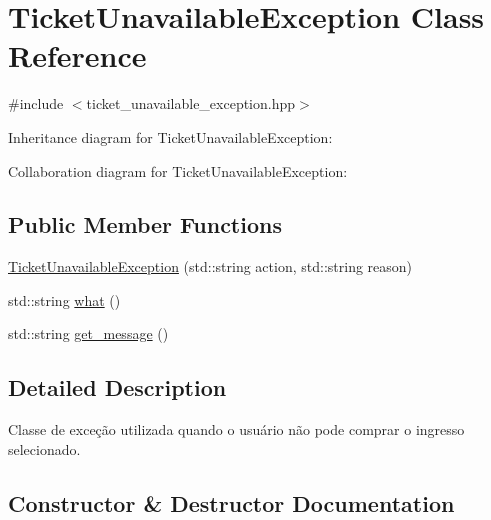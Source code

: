 \hypertarget{class_ticket_unavailable_exception}{}\section{Ticket\+Unavailable\+Exception Class Reference}
\label{class_ticket_unavailable_exception}


{\ttfamily \#include $<$ticket\+\_\+unavailable\+\_\+exception.\+hpp$>$}



Inheritance diagram for Ticket\+Unavailable\+Exception\+:


Collaboration diagram for Ticket\+Unavailable\+Exception\+:
\subsection*{Public Member Functions}
\begin{DoxyCompactItemize}
\item 
\hyperlink{class_ticket_unavailable_exception_aeedce6fc143b11709b330fc961cb357d}{Ticket\+Unavailable\+Exception} (std\+::string action, std\+::string reason)
\item 
std\+::string \hyperlink{class_ticket_unavailable_exception_a6b364ac50564675499a5f24f8d97faed}{what} ()
\item 
std\+::string \hyperlink{class_ticket_unavailable_exception_a4aadce4bf1d2958e91576d4d4cad1102}{get\+\_\+message} ()
\end{DoxyCompactItemize}


\subsection{Detailed Description}
Classe de exceção utilizada quando o usuário não pode comprar o ingresso selecionado. 

\subsection{Constructor \& Destructor Documentation}
\mbox{\label{class_ticket_unavailable_exception_aeedce6fc143b11709b330fc961cb357d}} 
